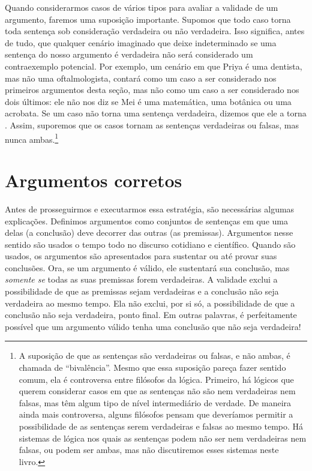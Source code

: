 Quando considerarmos casos de vários tipos para avaliar a validade de um argumento, faremos uma suposição importante. Supomos que todo caso torna toda sentença sob consideração verdadeira ou não verdadeira. Isso significa, antes de tudo, que qualquer cenário imaginado que deixe indeterminado se uma sentença do nosso argumento é verdadeira não será considerado um contraexemplo potencial. Por exemplo, um cenário em que Priya é uma dentista, mas não uma oftalmologista, contará como um caso a ser considerado nos primeiros argumentos desta seção, mas não como um caso a ser considerado nos dois últimos: ele não nos diz se Mei é uma matemática, uma botânica ou uma acrobata. Se um caso não torna uma sentença verdadeira, dizemos que ele a torna . Assim, suporemos que os casos tornam as sentenças verdadeiras ou falsas, mas nunca ambas.\footnote{A suposição de que as sentenças são verdadeiras ou falsas, e não ambas, é chamada de \textquotedblleft bivalência\textquotedblright{}. Mesmo que essa suposição pareça fazer sentido comum, ela é controversa entre filósofos da lógica. Primeiro, há lógicos que querem considerar casos em que as sentenças não são nem verdadeiras nem falsas, mas têm algum tipo de nível intermediário de verdade. De maneira ainda mais controversa, alguns filósofos pensam que deveríamos permitir a possibilidade de as sentenças serem verdadeiras e falsas ao mesmo tempo. Há sistemas de lógica nos quais as sentenças podem não ser nem verdadeiras nem falsas, ou podem ser ambas, mas não discutiremos esses sistemas neste livro.}

\section{Argumentos corretos}

Antes de prosseguirmos e executarmos essa estratégia, são necessárias algumas explicações. Definimos argumentos como conjuntos de sentenças em que uma delas (a conclusão) deve decorrer das outras (as premissas). Argumentos nesse sentido são usados o tempo todo no discurso cotidiano e científico. Quando são usados, os argumentos são apresentados para sustentar ou até provar suas conclusões. Ora, se um argumento é válido, ele sustentará sua conclusão, mas \emph{somente se} todas as suas premissas forem verdadeiras. A validade exclui a possibilidade de que as premissas sejam verdadeiras e a conclusão não seja verdadeira ao mesmo tempo. Ela não exclui, por si só, a possibilidade de que a conclusão não seja verdadeira, ponto final. Em outras palavras, é perfeitamente possível que um argumento válido tenha uma conclusão que não seja verdadeira!

